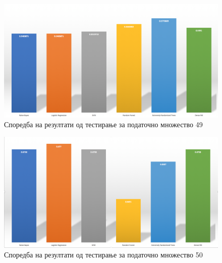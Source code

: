 \begin{figure}[H]
\centering
\includegraphics[scale=0.34]{images/comparison_algo_49.png}
\caption{Споредба на резултати од тестирање за податочно множество 49}
\label{fig:comparison_49}
\centering
\end{figure}

\begin{figure}[H]
\centering
\includegraphics[scale=0.34]{images/comparison_algo_50.png}
\caption{Споредба на резултати од тестирање за податочно множество 50}
\label{fig:comparison_50}
\centering
\end{figure}


